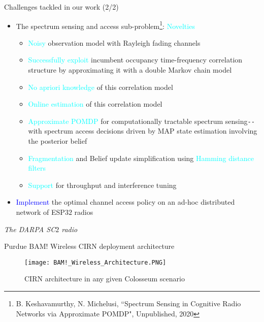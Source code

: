 \documentclass{beamer}
\begin{document}
\begin{frame}{Challenges tackled in our work (2/2)}
\begin{itemize}
    \item The spectrum sensing and access sub-problem\footnote{\tiny{B. Keshavamurthy, N. Michelusi, ``Spectrum Sensing in Cognitive Radio Networks via Approximate POMDP", Unpublished, 2020}}: \textcolor{cyan}{Novelties}
    \begin{itemize}
        \item \textcolor{cyan}{Noisy} observation model with Rayleigh fading channels
        \item \textcolor{cyan}{Successfully exploit} incumbent occupancy time-frequency correlation structure by approximating it with a double Markov chain model
        \item \textcolor{cyan}{No apriori knowledge} of this correlation model
        \item \textcolor{cyan}{Online estimation} of this correlation model
        \item \textcolor{cyan}{Approximate POMDP} for computationally tractable spectrum sensing\texttt{-{}-}with spectrum access decisions driven by MAP state estimation involving the posterior belief
        \item \textcolor{cyan}{Fragmentation} and Belief update simplification using \textcolor{cyan}{Hamming distance filters}
        \item \textcolor{cyan}{Support} for throughput and interference tuning
    \end{itemize}
    \item \textcolor{blue}{Implement} the optimal channel access policy on an ad-hoc distributed network of ESP$32$ radios
\end{itemize}
\end{frame}
\begin{frame}{}
  \centering \Huge
  \emph{The DARPA SC$2$ radio}
\end{frame}
\begin{frame}{Purdue BAM! Wireless CIRN deployment architecture}
\begin{figure}
    \centering
    \texttt{[image: BAM!\_Wireless\_Architecture.PNG]}
    \caption{CIRN architecture in any given Colosseum scenario}
    \label{fig:1}
\end{figure}
\end{frame}
\end{document}
